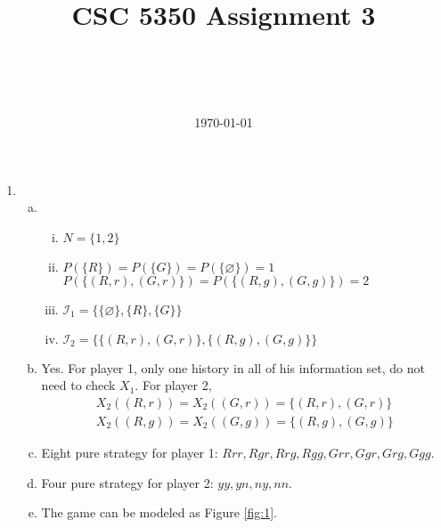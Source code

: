 \documentclass[a4paper,12pt]{article}
\title{CSC 5350 Assignment 3}
\author{\myname\\\mymail\\\CSE\\\CUHK}
\date{\today}
\begin{document}
\maketitle
\begin{enumerate}
\item
\begin{enumerate}[(a)]
\item

    \begin{enumerate}[i.]
    \item
        $N=\{1,2\}$
    \item
        $P(\{R\})=P(\{G\})=P(\{\varnothing\})=1$\\
        $P(\{(R,r),(G,r)\})=P(\{(R,g),(G,g)\})=2$
    \item
        $\mathcal {I}_1=\{\{\varnothing\},\{R\},\{G\}\}$
    \item
        $\mathcal {I}_2=\{\{(R,r),(G,r)\},\{(R,g),(G,g)\}\}$
    \end{enumerate}

\item
    Yes. For player 1, only one history in all of his information set, do not need to check $X_1$.
    For player 2,
    \begin{displaymath}
    \begin{array}{c}
        X_2((R,r))=X_2((G,r))=\{(R,r),(G,r)\}\\
        X_2((R,g))=X_2((G,g))=\{(R,g),(G,g)\}
    \end{array}
    \end{displaymath}

\item
    Eight pure strategy for player 1: $Rrr,Rgr,Rrg,Rgg,Grr,Ggr,Grg,Ggg$.

\item
    Four pure strategy for player 2: $yy,yn,ny,nn$.

\item
The game can be modeled as Figure \ref{fig:1}.
\begin{figure}[!htb]
\centering
{}
\end{figure}
\end{enumerate}
\end{enumerate}
\end{document}
